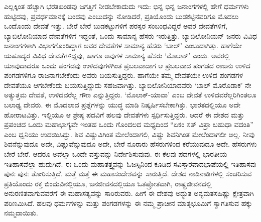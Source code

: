 ಎಲ್ಲಕ್ಕಿಂತ ಹೆಚ್ಚಾಗಿ ಭರತಖಂಡವು ಜಗತ್ತಿಗೆ ನೀಡಬೇಕಾದುದು ಇದು: ಭಿನ್ನ ಭಿನ್ನ ಜನಾಂಗಗಳಲ್ಲಿ ಹೇಗೆ ಧರ್ಮಗಳು ಹುಟ್ಟಿದವು, ಪ್ರವರ್ಧಮಾನಕ್ಕೆ ಬಂದವು ಎಂಬುದನ್ನು ನೋಡಿದರೆ, ಪ್ರತಿಯೊಂದು ಬುಡಕಟ್ಟಿನವರಿಗೂ ಮೊದಲು ಒಂದೊಂದು ದೇವತೆ ಇತ್ತು. ಬೇರೆ ಬೇರೆ ಬುಡಕಟ್ಟುಗಳಿಗೆ ಪರಸ್ಪರ ಸಂಬಂಧವಿದ್ದರೆ ಅವರ ದೇವತೆಗಳಿಗೆ, ಬ್ಯಾಬಿಲೋನಿಯಾದ ದೇವತೆಗಳಿಗೆ ಇದ್ದಂತೆ, ಒಂದು ಸಾಮಾನ್ಯ ಹೆಸರು ಇರುತ್ತಿತ್ತು. ಬ್ಯಾಬಿಲೋನಿಯನ್​ ಜನರು ವಿವಿಧ ಜನಾಂಗಗಳಾಗಿ ವಿಭಾಗಗೊಂಡಿದ್ದಾಗ ಅವರ ದೇವತೆಗಳ ಸಾಮಾನ್ಯ ಹೆಸರು ‘ಬಾಲ್​’ ಎಂಬುದಾಗಿತ್ತು. ಹಾಗೆಯೇ ಯಹೂದ್ಯರ ವಿವಿಧ ದೇವತೆಗಳಿದ್ದವು, ಹಾಗೂ ಅವುಗಳ ಸಾಮಾನ್ಯ ಹೆಸರು ‘ಮೊಲಾಕ್​’ ಎಂದು. ಅವರಲ್ಲಿ ಯಾವುದಾದರೂ ಒಂದು ಪಂಗಡವು ಉಳಿದವುಗಳಿಗಿಂತ ಪ್ರಬಲವಾದಾಗ ಆ ಪ್ರಬಲವಾದ ಪಂಗಡದ ರಾಜನು ಉಳಿದ ಪಂಗಡಗಳಿಗೂ ರಾಜನಾಗಬೇಕೆಂದು ಅವರು ಬಯಸುತ್ತಿದ್ದರು. ಹಾಗೆಯೇ ತಮ್ಮ ದೇವತೆಯೇ ಉಳಿದ ಪಂಗಡಗಳ ದೇವತೆಯೂ ಆಗಬೇಕೆಂದು ಬಯಸುತ್ತಿದ್ದುದು ಸಹಜವಾಗಿತ್ತು. ಬ್ಯಾಬಿಲೋನಿಯಾದವರು ‘ಬಾಲ್​ ಮೊರೊಡಾಕ’ ನೇ ಅತ್ಯುತ್ತಮ ದೇವತೆ, ಉಳಿದವರೆಲ್ಲ ಗೌಣ ಎನ್ನುತ್ತಿದ್ದರು. ‘ಮೊಲಾಕ್​-ಯಾವಾ’ ಎಂಬ ದೇವತೆ ಉಳಿದವರೆಲ್ಲರಿಗಿಂತಲೂ ಬಲಾಢ್ಯ ದೇವರು. ಈ ಮೊದಲಾದ ಪ್ರಶ್ನೆಗಳನ್ನು ಯುದ್ಧ ಮಾಡಿ ನಿಷ್ಕರ್ಷಿಸಬೇಕಾಗಿತ್ತು. ಭಾರತದಲ್ಲಿಯೂ ಅದೇ ಹೋರಾಟವಿತ್ತು. ಇಲ್ಲಿಯೂ ಆ ಶ್ರೇಷ್ಠ ಪದವಿಗೆ ಹಲವು ದೇವತೆಗಳು ಸ್ಪರ್ಧಿಸುತ್ತಿದ್ದರು. ಆದರೆ ಈ ದೇಶದ ಮತ್ತು ಪ್ರಪಂಚದ ಒಂದು ಮಹಾಭಾಗ್ಯವೇ ಇಂತಹ ಒಂದು ಗೊಂದಲದ ಮಧ್ಯದಿಂದ “ಏಕಂ ಸತ್​ ವಿಪ್ರಾ ಬಹುಧಾ ವದಂತಿ” ಎಂಬ ಧ್ವನಿಯು ಉದಯಿಸಿದ್ದು. ಶಿವ ವಿಷ್ಣುವಿಗಿಂತ ಮೇಲೆಂದಾಗಲಿ, ವಿಷ್ಣು ಶಿವನಿಗಿಂತ ಮೇಲೆಂದಾಗಲೀ ಅಲ್ಲ. ನೀವು ಶಿವನೆನ್ನುವುದೂ ಅದೇ, ವಿಷ್ಣುವೆನ್ನುವುದೂ ಅದೇ, ಬೇರೆ ನೂರಾರು ಹೆಸರುಗಳಿಂದ ಕರೆಯುವುದೂ ಅದೇ. ಹೆಸರುಗಳು ಬೇರೆ ಬೇರೆ. ಆದರೂ ಅವೆಲ್ಲಾ ಒಂದೇ ವಸ್ತುವನ್ನು ನಿರ್ದೇಶಿಸುವುವು. ಈ ಕೆಲವು ಪದಗಳಲ್ಲಿ ಭಾರತೀಯ ಇತಿಹಾಸವೆಲ್ಲಾ ಹುದುಗಿದೆ. ಈ ಒಂದು ಮಹಾತತ್ತ್ವವನ್ನು ಓಜಸ್ಸಿನಿಂದ ಕೂಡಿದ ಸವಿಸ್ತಾರವಾದ\break ಭಾಷೆಯಲ್ಲಿ ಇತಿಹಾಸವು ಪುನಃ ಪುನಃ ತೋರಿಸುತ್ತಿದೆ. ಮತ್ತೆ ಮತ್ತೆ ಈ ಮಹಾಸಂದೇಶವನ್ನು ಸಾರುತ್ತಿದೆ. ದೇಶದ ನಾಡಿನಾಡಿಗಳಲ್ಲಿ ಸಂಚರಿಸುವ ಪ್ರತಿಯೊಂದು ರಕ್ತ ಬಿಂದುವಿನಲ್ಲಿಯೂ, ಜನಜೀವನದಲ್ಲಿಯೂ ಓತಪ್ರೋತವಾಗಿ, ರಾಷ್ಟ್ರಜೀವನದಲ್ಲಿ ಅನುರಣಿತವಾಗುವವರೆಗೆ ಈ ಮಹಾಸತ್ಯವನ್ನು ಸಾರಿರುವರು. ಹೀಗೆ ಈ ದೇಶವು ಅದ್ಭುತ ಅನ್ಯಮತಸಹಿಷ್ಣು ಕ್ಷೇತ್ರವಾಗಿ ಪರಿಣಮಿಸಿದೆ. ಹಲವು ಧರ್ಮಗಳನ್ನು ಮತ್ತು ಪಂಗಡಗಳನ್ನು ಈ ನಮ್ಮ ಪ್ರಾಚೀನ ಮಾತೃಭೂಮಿಗೆ ಸ್ವಾಗತಿಸುವ ಹಕ್ಕು ನಮ್ಮದಾಯಿತು.

